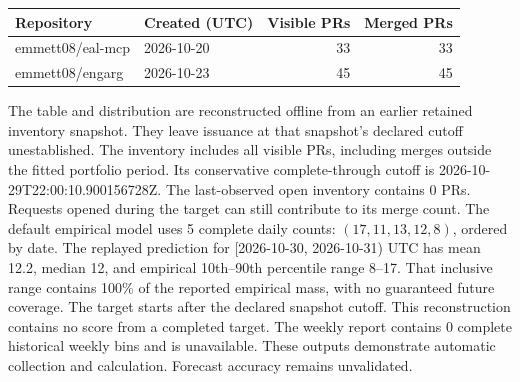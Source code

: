 \begin{center}
\begin{tabular}{@{}llrr@{}}
\toprule
Repository & Created (UTC) & Visible PRs & Merged PRs \\
\midrule
emmett08/eal-mcp & 2026-10-20 & 33 & 33 \\
emmett08/engarg & 2026-10-23 & 45 & 45 \\
\bottomrule
\end{tabular}
\end{center}
The table and distribution are reconstructed offline from an earlier retained inventory snapshot. They leave issuance at that snapshot's declared cutoff unestablished. The inventory includes all visible PRs, including merges outside the fitted portfolio period. Its conservative complete-through cutoff is 2026-10-29T22:00:10.900156728Z. The last-observed open inventory contains 0 PRs. Requests opened during the target can still contribute to its merge count.
The default empirical model uses 5 complete daily counts: $(17, 11, 13, 12, 8)$, ordered by date. The replayed prediction for [2026-10-30, 2026-10-31) UTC has mean 12.2, median 12, and empirical 10th--90th percentile range 8--17. That inclusive range contains 100\% of the reported empirical mass, with no guaranteed future coverage. The target starts after the declared snapshot cutoff. This reconstruction contains no score from a completed target.
The weekly report contains 0 complete historical weekly bins and is unavailable. These outputs demonstrate automatic collection and calculation. Forecast accuracy remains unvalidated.
